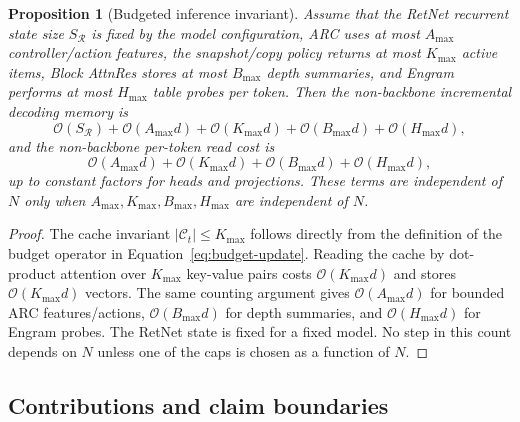 \documentclass[11pt]{article}
\newtheorem{proposition}[theorem]{Proposition}
\newcommand{\Ret}{\mathcal{R}}
\newcommand{\Cache}{\mathcal{C}}
\newcommand{\Oh}{\mathcal{O}}
\begin{document}
\begin{proposition}[Budgeted inference invariant]
\label{prop:budget-invariant}
Assume that the RetNet recurrent state size $S_{\Ret}$ is fixed by the model configuration, ARC uses at most $A_{\max}$ controller/action features, the snapshot/copy policy returns at most $K_{\max}$ active items, Block AttnRes stores at most $B_{\max}$ depth summaries, and Engram performs at most $H_{\max}$ table probes per token. Then the non-backbone incremental decoding memory is
\begin{equation}
\Oh(S_{\Ret})+\Oh(A_{\max}d)+\Oh(K_{\max}d)+\Oh(B_{\max}d)+\Oh(H_{\max}d),
\end{equation}
and the non-backbone per-token read cost is
\begin{equation}
\Oh(A_{\max}d)+\Oh(K_{\max}d)+\Oh(B_{\max}d)+\Oh(H_{\max}d),
\end{equation}
up to constant factors for heads and projections. These terms are independent of $N$ only when $A_{\max},K_{\max},B_{\max},H_{\max}$ are independent of $N$.
\end{proposition}

\begin{proof}
The cache invariant $|\Cache_t|\leq K_{\max}$ follows directly from the definition of the budget operator in Equation~\eqref{eq:budget-update}. Reading the cache by dot-product attention over $K_{\max}$ key-value pairs costs $\Oh(K_{\max}d)$ and stores $\Oh(K_{\max}d)$ vectors. The same counting argument gives $\Oh(A_{\max}d)$ for bounded ARC features/actions, $\Oh(B_{\max}d)$ for depth summaries, and $\Oh(H_{\max}d)$ for Engram probes. The RetNet state is fixed for a fixed model. No step in this count depends on $N$ unless one of the caps is chosen as a function of $N$.
\end{proof}

\subsection{Contributions and claim boundaries}
\end{document}
